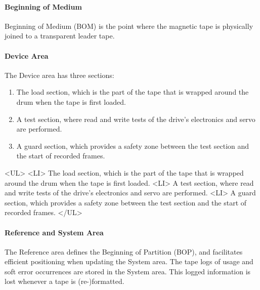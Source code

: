 \paragraph {Beginning of Medium}

Beginning of Medium (BOM) is the point where the magnetic tape is physically
joined to a transparent leader tape.

\paragraph {Device Area}

The Device area has three sections:

\begin {latexonly}

\begin {enumerate}
\renewcommand{\theenumi}{\alph{enumi}}

\item The load section, which is the part of the tape
that is wrapped around the drum when the tape is first loaded.

\item A test section, where read and write tests of the
drive's electronics and servo are performed.

\item A guard section, which provides a safety zone
between the test section and the start of recorded frames.

\end {enumerate}

\end {latexonly}

\begin{htmlonly}
\begin{rawhtml}
<UL>
<LI> The load section, which is the part of the tape that is wrapped around
the drum when the tape is first loaded.
<LI> A test section, where read and write tests of the drive's electronics
and servo are performed.
<LI> A guard section, which provides a safety zone between the test section
and the start of recorded frames.
</UL>
\end{rawhtml}
\end{htmlonly}

\paragraph {Reference and System Area}

The Reference area defines the Beginning of Partition (BOP), and facilitates
efficient positioning when updating the System area. The tape logs of usage
and soft error occurrences are stored in the System area. This logged
information is lost whenever a tape is (re-)formatted.

